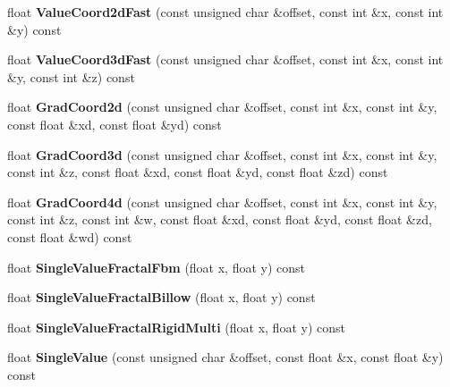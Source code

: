 \begin{DoxyCompactItemize}
float {\bfseries Value\+Coord2d\+Fast} (const unsigned char \&offset, const int \&x, const int \&y) const
\item 
\mbox{\label{class_flounder_1_1_noise_fast_a2c6974a3da6b2a2088be9fd0213096f7}} 
float {\bfseries Value\+Coord3d\+Fast} (const unsigned char \&offset, const int \&x, const int \&y, const int \&z) const
\item 
\mbox{\label{class_flounder_1_1_noise_fast_aa5377d556a6727c24229e562bbd1d21e}} 
float {\bfseries Grad\+Coord2d} (const unsigned char \&offset, const int \&x, const int \&y, const float \&xd, const float \&yd) const
\item 
\mbox{\label{class_flounder_1_1_noise_fast_a86af7cae1fc13c466ff48ad55a73cbfc}} 
float {\bfseries Grad\+Coord3d} (const unsigned char \&offset, const int \&x, const int \&y, const int \&z, const float \&xd, const float \&yd, const float \&zd) const
\item 
\mbox{\label{class_flounder_1_1_noise_fast_a15007e4cfb4d11fc2f08191dec18c08d}} 
float {\bfseries Grad\+Coord4d} (const unsigned char \&offset, const int \&x, const int \&y, const int \&z, const int \&w, const float \&xd, const float \&yd, const float \&zd, const float \&wd) const
\item 
\mbox{\label{class_flounder_1_1_noise_fast_a8e96bfe7b76b755ac0da7ae4db6390e5}} 
float {\bfseries Single\+Value\+Fractal\+Fbm} (float x, float y) const
\item 
\mbox{\label{class_flounder_1_1_noise_fast_a2b43f9b3d19f17a6cfc7d5ce492f7dab}} 
float {\bfseries Single\+Value\+Fractal\+Billow} (float x, float y) const
\item 
\mbox{\label{class_flounder_1_1_noise_fast_a5741efa77f756aa2db53e219b1552149}} 
float {\bfseries Single\+Value\+Fractal\+Rigid\+Multi} (float x, float y) const
\item 
\mbox{\label{class_flounder_1_1_noise_fast_a677c6c18ccd58c8cd226f837e77ce183}} 
float {\bfseries Single\+Value} (const unsigned char \&offset, const float \&x, const float \&y) const

\end{DoxyCompactItemize}

